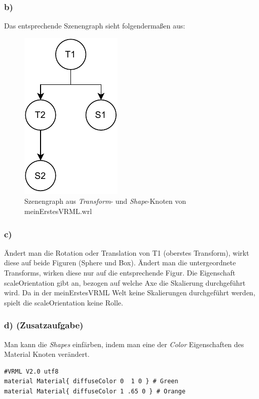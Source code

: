 \documentclass{article}
\begin{document}
\subsubsection*{b)}
Das entsprechende Szenengraph sieht folgendermaßen aus:

\begin{figure}[!!h]
    \centering
    \includegraphics{V1_SceneGraph.pdf}
    \caption{Szenengraph aus \textit{Transform}- und \textit{Shape}-Knoten von meinErstesVRML.wrl}
\end{figure}


\subsubsection*{c)}
Ändert man die Rotation oder Translation von T1 (oberstes Transform), wirkt 
diese auf beide Figuren (Sphere und Box). Ändert man die untergeordnete
Transforms, wirken diese nur auf die entsprechende Figur. Die Eigenschaft
scaleOrientation gibt an, bezogen auf welche Axe die Skalierung durchgeführt
wird. Da in der meinErstesVRML Welt keine Skalierungen durchgeführt werden, 
spielt die scaleOrientation keine Rolle.

\subsubsection*{d) (Zusatzaufgabe)}
Man kann die \textit{Shapes} einfärben, indem man eine der \textit{Color}
Eigenschaften des Material Knoten verändert. 

\begin{lstlisting}[language=VRML]
#VRML V2.0 utf8
material Material{ diffuseColor 0  1 0 } # Green
material Material{ diffuseColor 1 .65 0 } # Orange
\end{lstlisting}
\end{document}
